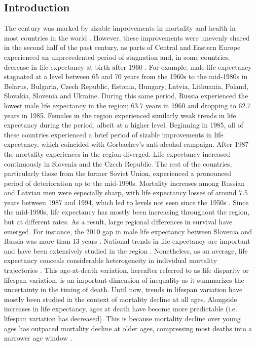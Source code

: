 \documentclass{article}
\begin{document}
\begin{spacing}{1.5}
\section*{Introduction}
The  century was marked by sizable improvements in mortality and health in most countries in the world \citep{who2000}. However, these improvements were unevenly shared in the second half of the past century, as parts of Central and Eastern Europe experienced an unprecedented period of stagnation and, in some countries, decrease in life expectancy at birth after 1960 \citep{HMD}. For example, male life expectancy stagnated at a level between 65 and 70 years from the 1960s to the mid-1980s in Belarus, Bulgaria, Czech Republic, Estonia, Hungary, Latvia, Lithuania, Poland, Slovakia, Slovenia and Ukraine. During this same period, Russia experienced the lowest male life expectancy in the region; 63.7 years in 1960 and dropping to 62.7 years in 1985. Females in the region experienced similarly weak trends in life expectancy during the period, albeit at a higher level. 
Beginning in 1985, all of these countries experienced a brief period of sizable improvements in life expectancy, which coincided with Gorbachev's anti-alcohol campaign. After 1987 the mortality experiences in the region diverged. Life expectancy increased continuously in Slovenia and the Czech Republic. The rest of the countries, particularly those from the former Soviet Union, experienced a pronounced period of deterioration up to the mid-1990s. Mortality increases among Russian and Latvian men were especially sharp, with life expectancy losses of around 7.5 years between 1987 and 1994, which led to levels not seen since the 1950s \citep{shkolnikov2001}. Since the mid-1990s, life expectancy has mostly been increasing throughout the region, but at different rates. As a result, large regional differences in survival have emerged. For instance, the 2010 gap in male life expectancy between Slovenia and Russia was more than 13 years \citep{HMD}.
National trends in life expectancy are important and have been extensively studied in the region \citep{mesle2004mortality, mesle2000, Cockerham1997, chenet1996}. Nonetheless, as an average, life expectancy conceals considerable heterogeneity in individual mortality trajectories \citep{edwards2005, wilmoth1999}. This age-at-death variation, hereafter referred to as life disparity or lifespan variation, is an important dimension of inequality as it summarizes the uncertainty in the timing of death. Until now, trends in lifespan variation have mostly been studied in the context of mortality decline at all ages. Alongside increases in life expectancy, ages at death have become more predictable (i.e. lifespan variation has decreased). This is because mortality decline over young ages has outpaced mortality decline at older ages, compressing most deaths into a narrower age window \citep{vaupel2011}. 

\end{spacing}
\end{document}

